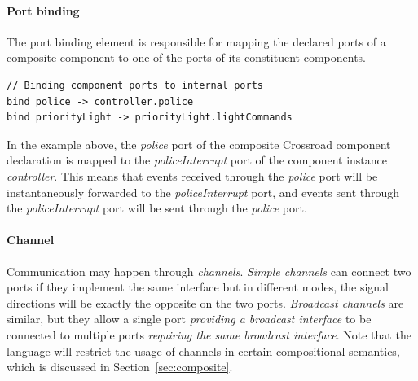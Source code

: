 \paragraph{Port binding} The port binding element is responsible for mapping the declared ports of a composite component to one of the ports of its constituent components.


\begin{lstlisting}
// Binding component ports to internal ports
bind police -> controller.police
bind priorityLight -> priorityLight.lightCommands
\end{lstlisting}

In the example above, the \emph{police} port of the composite Crossroad component declaration is mapped to the \emph{policeInterrupt} port of the component instance \emph{controller}. This means that events received through the \emph{police} port will be instantaneously forwarded to the \emph{policeInterrupt} port, and events sent through the \emph{policeInterrupt} port will be sent through the \emph{police} port.

\paragraph{Channel} 
Communication may happen through \emph{channels}. \emph{Simple channels} can connect two ports if they implement the same interface but in different modes, \ie the signal directions will be exactly the opposite on the two ports. \emph{Broadcast channels} are similar, but they allow a single port \emph{providing a broadcast interface} to be connected to multiple ports \emph{requiring the same broadcast interface}. Note that the language will restrict the usage of channels in certain compositional semantics, which is discussed in Section~\ref{sec:composite}.

